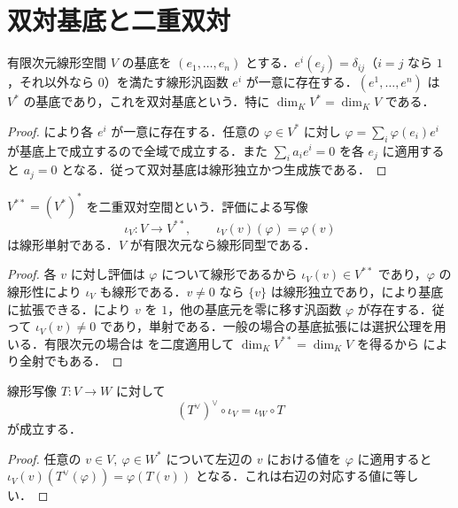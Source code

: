 \section{双対基底と二重双対}
\begin{prop}[有限次元の双対基底]
有限次元線形空間 $V$ の基底を $(e_1,\ldots,e_n)$ とする．$e^i(e_j)=\delta_{ij}$（$i=j$ なら $1$，それ以外なら $0$）を満たす線形汎函数 $e^i$ が一意に存在する．$(e^1,\ldots,e^n)$ は $V^*$ の基底であり，これを双対基底という．特に $\dim_K V^*=\dim_K V$ である．
\end{prop}
\begin{proof}
により各 $e^i$ が一意に存在する．任意の $\varphi\in V^*$ に対し $\varphi=\sum_i\varphi(e_i)e^i$ が基底上で成立するので全域で成立する．また $\sum_i a_ie^i=0$ を各 $e_j$ に適用すると $a_j=0$ となる．従って双対基底は線形独立かつ生成族である．
\end{proof}
\begin{prop}[二重双対への標準写像]
$V^{**}=(V^*)^*$ を二重双対空間という．評価による写像
\[
 \iota_V:V\to V^{**},\qquad \iota_V(v)(\varphi)=\varphi(v)
\]
は線形単射である．$V$ が有限次元なら線形同型である．
\end{prop}
\begin{proof}
各 $v$ に対し評価は $\varphi$ について線形であるから $\iota_V(v)\in V^{**}$ であり，$\varphi$ の線形性により $\iota_V$ も線形である．$v\ne0$ なら $\{v\}$ は線形独立であり，により基底に拡張できる．により $v$ を $1$，他の基底元を零に移す汎函数 $\varphi$ が存在する．従って $\iota_V(v)\ne0$ であり，単射である．一般の場合の基底拡張には選択公理を用いる．有限次元の場合は を二度適用して $\dim_K V^{**}=\dim_K V$ を得るから により全射でもある．
\end{proof}
\begin{prop}[二重双対と線形写像の整合性]
線形写像 $T:V\to W$ に対して
\[
 (T^\vee)^\vee\circ\iota_V=\iota_W\circ T
\]
が成立する．
\end{prop}
\begin{proof}
任意の $v\in V,\ \varphi\in W^*$ について左辺の $v$ における値を $\varphi$ に適用すると $\iota_V(v)(T^\vee(\varphi))=\varphi(T(v))$ となる．これは右辺の対応する値に等しい．
\end{proof}

